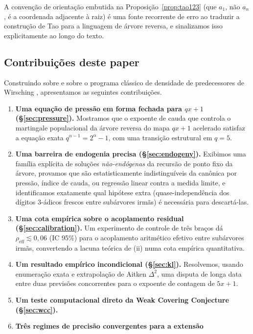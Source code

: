 \documentclass[11pt]{article}
\theoremstyle{definition}
\theoremstyle{remark}
\begin{document}
A convenção de orientação embutida na Proposição~\ref{prop:tao123}
(que $a_1$, não $a_n$, é a coordenada adjacente à raiz) é uma fonte
recorrente de erro ao traduzir a construção de Tao para a linguagem de
árvore reversa, e sinalizamos isso explicitamente ao longo do texto.

\subsection{Contribuições deste paper}

Construindo sobre \cite{Tao2022} e sobre o programa clássico de
densidade de predecessores de Wirsching \cite{Wirsching1998,
Wirsching2003}, apresentamos as seguintes contribuições.

\begin{enumerate}[label=(\roman*)]
\item \textbf{Uma equação de pressão em forma fechada para $qx+1$
  (\S\ref{sec:pressure}).} Mostramos que o expoente de cauda que
  controla o martingale populacional da árvore reversa do mapa $qx+1$
  acelerado satisfaz a equação exata $q^{\alpha-1}=2^\alpha-1$, com uma
  transição estrutural em $q=5$.
\item \textbf{Uma barreira de endogenia precisa (\S\ref{sec:endogeny}).}
  Exibimos uma família explícita de soluções \emph{não-endógenas} da
  recursão de ponto fixo da árvore, provamos que são estatisticamente
  indistinguíveis da canônica por pressão, índice de cauda, ou
  regressão linear contra a medida limite, e identificamos exatamente
  qual hipótese extra (quase-independência dos dígitos $3$-ádicos
  frescos entre subárvores irmãs) é necessária para descartá-las.
\item \textbf{Uma cota empírica sobre o acoplamento residual
  (\S\ref{sec:calibration}).} Um experimento de controle de três
  braços dá $\rho_{\mathrm{eff}} \lesssim 0{,}06$ (IC 95\%) para o
  acoplamento aritmético efetivo entre subárvores irmãs, convertendo a
  lacuna teórica de (ii) numa cota empírica quantitativa.
\item \textbf{Um resultado empírico incondicional (\S\ref{sec:kl}).}
  Resolvemos, usando enumeração exata e extrapolação de Aitken $\Delta^2$, uma
  disputa de longa data entre duas previsões concorrentes para o
  expoente de contagem de $5x+1$.
\item \textbf{Um teste computacional direto da Weak Covering
  Conjecture (\S\ref{sec:wcc}).}
\item \textbf{Três regimes de precisão convergentes para a extensão
}
\end{enumerate}
\end{document}
